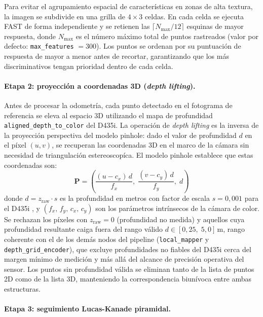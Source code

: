 Para evitar el agrupamiento espacial de características en zonas de alta
textura, la imagen se subdivide en una grilla de $4 \times 3$ celdas.
En cada celda se ejecuta FAST de forma independiente y se retienen las
$\lceil N_{\max} / 12 \rceil$ esquinas de mayor respuesta, donde
$N_{\max}$ es el número máximo total de puntos rastreados (valor por defecto:
\texttt{max\_features} $= 300$). Los puntos se ordenan por su puntuación de
respuesta de mayor a menor antes de recortar, garantizando que los más
discriminativos tengan prioridad dentro de cada celda.

\paragraph{Etapa 2: proyección a coordenadas 3D (\emph{depth lifting}).}

Antes de procesar la odometría, cada punto detectado en el fotograma de
referencia se eleva al espacio 3D utilizando el mapa de profundidad
\texttt{aligned\_depth\_to\_color} del D435i. La operación de
\emph{depth lifting} es la inversa de la proyección perspectiva del modelo
pinhole: dado el valor de profundidad $d$ en el píxel $(u, v)$, se recuperan
las coordenadas 3D en el marco de la cámara sin necesidad de triangulación
estereoscopíca. El modelo pinhole establece que estas coordenadas son:
%
\begin{equation}
  \label{eq:lifting}
  \mathbf{P} =
  \left(
    \frac{(u - c_x)\,d}{f_x},\;
    \frac{(v - c_y)\,d}{f_y},\;
    d
  \right)
\end{equation}
%
donde $d = z_{\text{raw}} \cdot s$ es la profundidad en metros con factor de
escala $s = 0{,}001$ para el D435i \cite{RS-D400}, y
$(f_x,\, f_y,\, c_x,\, c_y)$ son los parámetros intrínsecos de la cámara de
color. Se rechazan los píxeles con $z_{\text{raw}} = 0$ (profundidad no
medida) y aquellos cuya profundidad resultante caiga fuera del rango válido
$d \in [0{,}25,\; 5{,}0]\,\text{m}$, rango coherente con el de los demás nodos
del pipeline (\texttt{local\_mapper} y \texttt{depth\_grid\_encoder}), que
excluye profundidades no fiables del D435i cerca del margen mínimo de medición
y más allá del alcance de precisión operativa del sensor.
Los puntos sin profundidad válida se eliminan tanto de la lista de puntos 2D
como de la lista 3D, manteniendo la correspondencia biunívoca entre ambas
estructuras.

\paragraph{Etapa 3: seguimiento Lucas-Kanade piramidal.}

